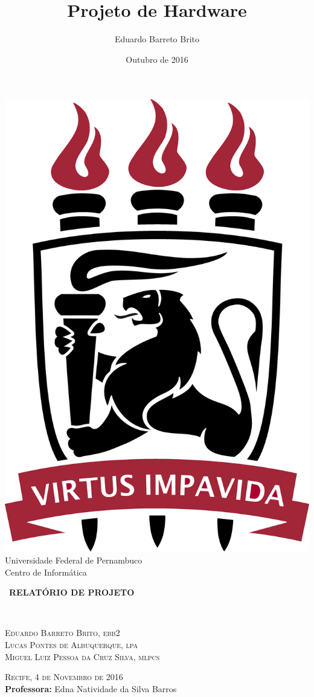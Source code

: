 \documentclass{article}
\title{Projeto de Hardware}
\author{Eduardo Barreto Brito}
\date{Outubro de 2016}
\begin{document}
    \thispagestyle{empty}
    \begin{center}
        \includegraphics[scale=0.01]{ufpe.png}\\
        \large{{\sc Universidade Federal de Pernambuco}}\\
        \large{{\sc Centro de Informática}}
    \end{center}
    \vspace{7cm}
    \hrulefill
    \begin{center}
        \large{ \ {\bf RELATÓRIO DE PROJETO}}\\[0.2cm]
    \end{center}
    \hrulefill\\[3.4cm]
    \begin{center}
        \textsc{Eduardo Barreto Brito, ebb2}\\
        \textsc{Lucas Pontes de Albuquerque, lpa}\\
        \textsc{Miguel Luiz Pessoa da Cruz Silva, mlpcs}
    \end{center}
    \vspace{2.6cm}
    \textsc{Recife, 4 de Novembro de 2016}\\
    {\bf Professora:} Edna Natividade da Silva Barros
    
\end{document}
